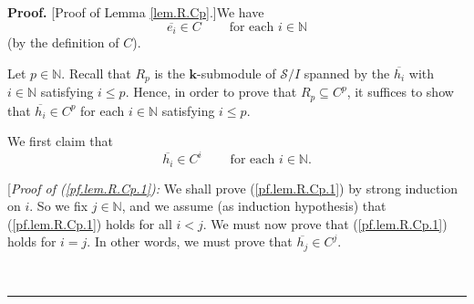 \documentclass[numbers=enddot,12pt,final,onecolumn,notitlepage]{scrartcl}%
\theoremstyle{definition}
\newenvironment{proof}[1][Proof]{\noindent\textbf{#1.} }{\ \rule{0.5em}{0.5em}}
\begin{document}
\begin{proof}
[Proof of Lemma \ref{lem.R.Cp}.]We have%
\begin{equation}
\overline{e_{i}}\in C\ \ \ \ \ \ \ \ \ \ \text{for each }i\in\mathbb{N}
\label{pf.lem.R.Cp.eiinC}%
\end{equation}
(by the definition of $C$).

Let $p\in\mathbb{N}$. Recall that $R_{p}$ is the $\mathbf{k}$-submodule of
$\mathcal{S}/I$ spanned by the $\overline{h_{i}}$ with $i\in\mathbb{N}$
satisfying $i\leq p$. Hence, in order to prove that $R_{p}\subseteq C^{p}$, it
suffices to show that $\overline{h_{i}}\in C^{p}$ for each $i\in\mathbb{N}$
satisfying $i\leq p$.

We first claim that%
\begin{equation}
\overline{h_{i}}\in C^{i}\ \ \ \ \ \ \ \ \ \ \text{for each }i\in\mathbb{N}.
\label{pf.lem.R.Cp.1}%
\end{equation}


[\textit{Proof of (\ref{pf.lem.R.Cp.1}):} We shall prove (\ref{pf.lem.R.Cp.1})
by strong induction on $i$. So we fix $j\in\mathbb{N}$, and we assume (as
induction hypothesis) that (\ref{pf.lem.R.Cp.1}) holds for all $i<j$. We must
now prove that (\ref{pf.lem.R.Cp.1}) holds for $i=j$. In other words, we must
prove that $\overline{h_{j}}\in C^{j}$.


\end{proof}
\end{document}
